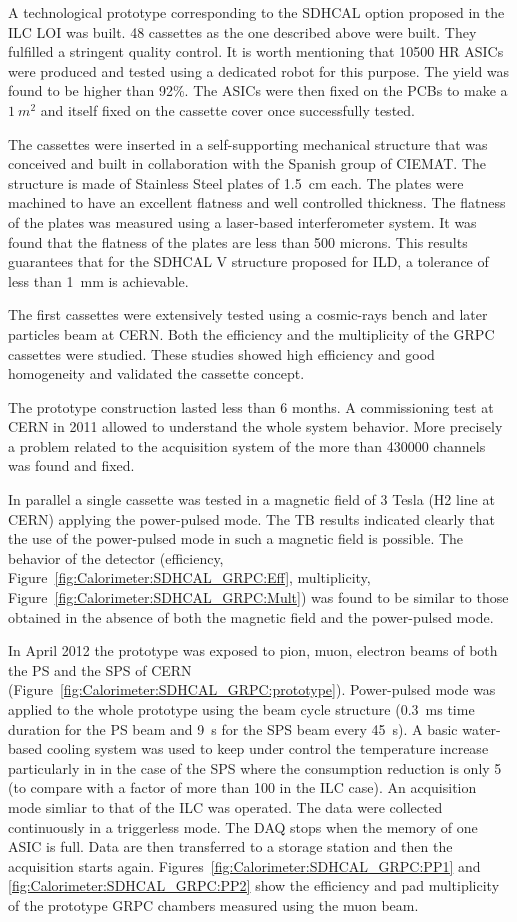 A technological prototype corresponding to the SDHCAL option proposed in the ILC
LOI was built. 48 cassettes as the one described above were built. They
fulfilled a stringent quality control. It is worth mentioning that 10500 HR
ASICs were produced and tested using a dedicated robot for this purpose. The
yield was found to be higher than 92\%. The ASICs were then fixed on the PCBs
to make a $\SI{1}{m^2}$ and itself fixed on the cassette cover once successfully
tested.

The cassettes were inserted in a self-supporting mechanical structure that was
conceived and built in collaboration with the Spanish group of CIEMAT. The
structure is made of Stainless Steel plates of \SI{1.5}{cm} each. The plates were
machined to have an excellent flatness and well controlled thickness. The
flatness of the plates was measured using a laser-based interferometer system.
It was found that the flatness of the plates are less than 500 microns. This
results guarantees that for the SDHCAL V structure proposed for ILD, a tolerance
of less than \SI{1}{mm} is achievable.

The first cassettes were extensively tested using a cosmic-rays bench and later
particles beam at CERN. Both the efficiency and the multiplicity of the GRPC
cassettes were studied. These studies showed high efficiency and good
homogeneity and validated the cassette concept.

The prototype construction lasted less than 6 months. A commissioning test at
CERN in 2011 allowed to understand the whole system behavior. More precisely a
problem related to the acquisition system of the more than 430000 channels was
found and fixed.

In parallel a single cassette was tested in a magnetic field of 3 Tesla (H2 line
at CERN) applying the power-pulsed mode. The TB results indicated clearly that
the use of the power-pulsed mode in such a magnetic field is possible. The
behavior of the detector (efficiency, Figure~\ref{fig:Calorimeter:SDHCAL_GRPC:Eff}, multiplicity, Figure~\ref{fig:Calorimeter:SDHCAL_GRPC:Mult}) was found to be similar to
those obtained in the absence of both the magnetic field and the power-pulsed
mode.

In April 2012 the prototype was exposed to pion, muon, electron beams of both
the PS and the SPS of CERN (Figure~\ref{fig:Calorimeter:SDHCAL_GRPC:prototype}). Power-pulsed mode was applied to the
whole prototype using the beam cycle structure (\SI{0.3}{ms} time duration for the PS
beam and \SI{9}{s} for the SPS beam every \SI{45}{s}). A basic water-based cooling system was
used to keep under control the temperature increase particularly in in the case
of the SPS where the consumption reduction is only 5 (to compare with a factor
of more than 100 in the ILC case). An acquisition mode simliar to that of the ILC was operated.
The data were collected continuously in a triggerless mode. The DAQ stops when
the memory of one ASIC is full. Data are then transferred to a storage station
and then the acquisition starts again. Figures~\ref{fig:Calorimeter:SDHCAL_GRPC:PP1} and \ref{fig:Calorimeter:SDHCAL_GRPC:PP2} show the efficiency and
pad multiplicity of the prototype GRPC chambers measured using the muon beam.

